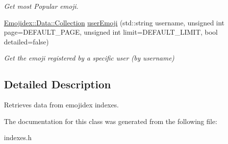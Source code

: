 \begin{DoxyCompactItemize}
\begin{DoxyCompactList}\small\item\em Get most Popular emoji. \end{DoxyCompactList}\item 
\hyperlink{classEmojidex_1_1Data_1_1Collection}{Emojidex\+::\+Data\+::\+Collection} \hyperlink{classEmojidex_1_1Service_1_1Indexes_ac489e53250311163cea342581ee5730d}{user\+Emoji} (std\+::string username, unsigned int page=D\+E\+F\+A\+U\+L\+T\+\_\+\+P\+A\+GE, unsigned int limit=D\+E\+F\+A\+U\+L\+T\+\_\+\+L\+I\+M\+IT, bool detailed=false)\hypertarget{classEmojidex_1_1Service_1_1Indexes_ac489e53250311163cea342581ee5730d}{}\label{classEmojidex_1_1Service_1_1Indexes_ac489e53250311163cea342581ee5730d}

\begin{DoxyCompactList}\small\item\em Get the emoji registered by a specific user (by username) \end{DoxyCompactList}\end{DoxyCompactItemize}


\subsection{Detailed Description}
Retrieves data from emojidex indexes. 

The documentation for this class was generated from the following file\+:\begin{DoxyCompactItemize}
\item 
indexes.\+h\end{DoxyCompactItemize}
